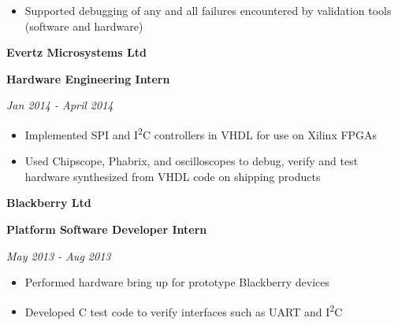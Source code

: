 \documentclass{article}
\newenvironment{name}{\fontfamily{phv}\selectfont\bfseries\normalsize}{\par}
\newenvironment{colorheading}{\fontfamily{phv}\selectfont\bfseries\normalsize\color{darkcyan}}{\par}
\newenvironment{metadata}{\fontfamily{phv}\selectfont\itshape\small\color{darkgray}}{\par}
\newenvironment{itemizedbody}{\fontfamily{phv}\selectfont\small\raggedright\begin{itemize}}{\end{itemize}\par}
\newenvironment{experience}[2]%
{%
  \begin{minipage}{0.71\linewidth}\raggedright#1\end{minipage}%
  \hfill%
  \begin{minipage}{0.28\linewidth}\raggedleft#2\end{minipage}%
}%
{\par}
\newcommand{\lineitem}{\item[{$\star$}]}
\begin{document}
\begin{minipage}[t]{0.67\linewidth}
\begin{itemizedbody}
                teams
      \lineitem Supported debugging of any and all failures encountered by validation tools (software and hardware)
    \end{itemizedbody}
    \smallskip
    \begin{experience}
    {
      \begin{name}Evertz Microsystems Ltd\end{name}
      \begin{colorheading}Hardware Engineering Intern\end{colorheading}
    }
    {
      \begin{metadata}Jan 2014 - April 2014\end{metadata}
    }
    \end{experience}
    \begin{itemizedbody}
      \lineitem Implemented SPI and I\textsuperscript{2}C controllers in VHDL for use on Xilinx FPGAs
      \lineitem Used Chipscope, Phabrix, and oscilloscopes to debug, verify and test hardware synthesized from VHDL code on
                shipping products
    \end{itemizedbody}
    \smallskip
    \begin{experience}
    {
      \begin{name}Blackberry Ltd\end{name}
      \begin{colorheading}Platform Software Developer Intern\end{colorheading}
    }
    {
      \begin{metadata}May 2013 - Aug 2013\end{metadata}
    }
    \end{experience}
    \begin{itemizedbody}
      \lineitem Performed hardware bring up for prototype Blackberry devices
      \lineitem Developed C test code to verify interfaces such as UART and I\textsuperscript{2}C
    \end{itemizedbody}

\end{minipage}
\end{document}
